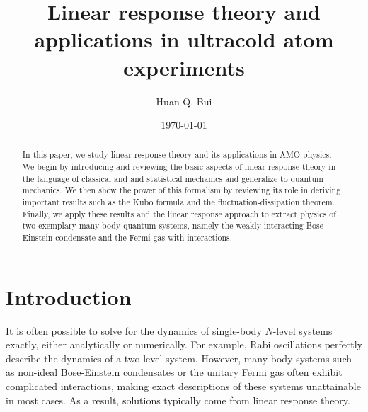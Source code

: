 \documentclass[reprint,
nofootinbib,
amsmath,amssymb,
aps]{revtex4-1}
\begin{document}
	
	

\title{Linear response theory and applications in ultracold atom experiments}
\author{Huan Q. Bui}
\date{\today}


\begin{abstract}
	In this paper, we study linear response theory and its applications in AMO physics. We begin by introducing and reviewing the basic aspects of linear response theory in the language of classical and and statistical mechanics and generalize to quantum mechanics. We then show the power of this formalism by reviewing its role in deriving important results such as the Kubo formula and the fluctuation-dissipation theorem. Finally, we apply these results and the linear response approach to extract physics of two exemplary many-body quantum systems, namely the weakly-interacting Bose-Einstein condensate and the Fermi gas with interactions.
\end{abstract}

\maketitle


\section{Introduction}



It is often possible to solve for the dynamics of single-body $N$-level systems exactly, either analytically or numerically. For example, Rabi oscillations perfectly describe the dynamics of a two-level system. However, many-body systems such as non-ideal Bose-Einstein condensates or the unitary Fermi gas often exhibit complicated interactions, making exact descriptions of these systems unattainable in most cases. As a result, solutions typically come from linear response theory. 
\end{document}
